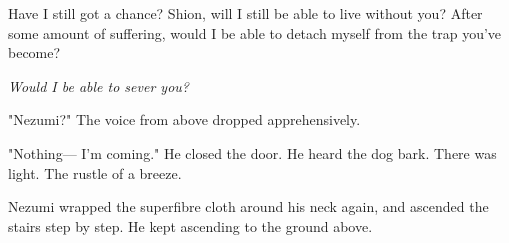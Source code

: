 Have I still got a chance? Shion, will I still be able to live without
you? After some amount of suffering, would I be able to detach myself
from the trap you've become?

\emph{Would I be able to sever you?}

"Nezumi?" The voice from above dropped apprehensively.

"Nothing--- I'm coming." He closed the door. He heard the dog bark. There
was light. The rustle of a breeze.

Nezumi wrapped the superfibre cloth around his neck again, and ascended
the stairs step by step. He kept ascending to the ground above.